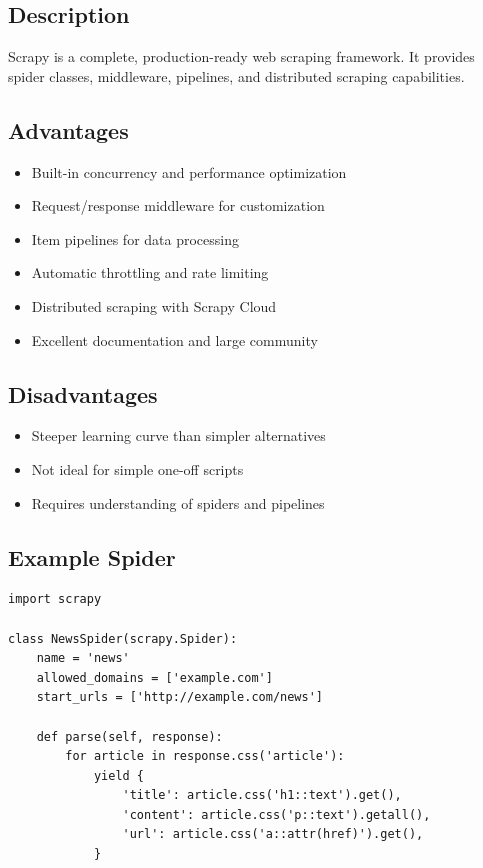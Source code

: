 \documentclass[12pt,a4paper]{report}
\begin{document}
\subsection{Description}

Scrapy is a complete, production-ready web scraping framework. It provides spider classes, middleware, pipelines, and distributed scraping capabilities.

\subsection{Advantages}

\begin{itemize}
    \item Built-in concurrency and performance optimization
    \item Request/response middleware for customization
    \item Item pipelines for data processing
    \item Automatic throttling and rate limiting
    \item Distributed scraping with Scrapy Cloud
    \item Excellent documentation and large community
\end{itemize}

\subsection{Disadvantages}

\begin{itemize}
    \item Steeper learning curve than simpler alternatives
    \item Not ideal for simple one-off scripts
    \item Requires understanding of spiders and pipelines
\end{itemize}

\subsection{Example Spider}

\begin{lstlisting}
import scrapy

class NewsSpider(scrapy.Spider):
    name = 'news'
    allowed_domains = ['example.com']
    start_urls = ['http://example.com/news']

    def parse(self, response):
        for article in response.css('article'):
            yield {
                'title': article.css('h1::text').get(),
                'content': article.css('p::text').getall(),
                'url': article.css('a::attr(href)').get(),
            }
\end{lstlisting}
\end{document}
